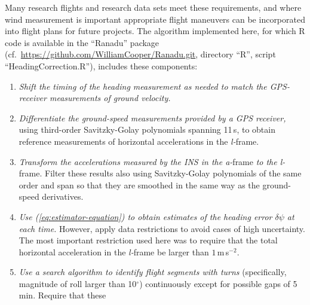 \documentclass[12pt,twoside,english,12pt,twoside,english]{article}\usepackage[]{graphicx}\usepackage[]{color}
\let\OrgIndex\index
\renewcommand*{\index}[1]{\OrgIndex{#1}}
\begin{document}
Many research flights and research data sets meet these requirements,
and where wind measurement
is important appropriate flight maneuvers can be incorporated into
flight plans for future projects. The algorithm
implemented here, for which R code is available in the ``Ranadu''
package (cf.~\url{https://github.com/WilliamCooper/Ranadu.git},
directory ``R'',
script ``HeadingCorrection.R''),
includes these components:
\begin{enumerate}
\item \emph{Shift the timing of the heading measurement as needed to match
the GPS-receiver measurements of ground velocity.} \emph{ }
\item \emph{Differentiate the ground-speed measurements provided by a GPS
receiver,} using
third-order Savitzky-Golay polynomials
spanning 11\,s, to obtain reference measurements of horizontal accelerations
in the \emph{l-}frame. 
\item \emph{Transform the accelerations measured by the INS in the a-}frame\emph{
to the l-}frame.  Filter
these results also using Savitzky-Golay polynomials of the same order
and span so that they are smoothed in the same way
as the ground-speed derivatives.
\item \emph{Use (\ref{eq:estimator-equation}) to obtain estimates of the
heading error $\delta\psi$ at each time.} However,
apply data restrictions to avoid cases of high uncertainty. The most
important restriction used here was to require that the total horizontal
acceleration in
the \emph{l-}frame
be larger than $1$\,m\,s$^{-2}$. 
\item \emph{Use a search algorithm to identify flight segments with turns}
(specifically, magnitude of roll larger than 10$^{\circ}$)
continuously except for possible gaps of 5\,min. Require that these

\end{enumerate}
\end{document}
